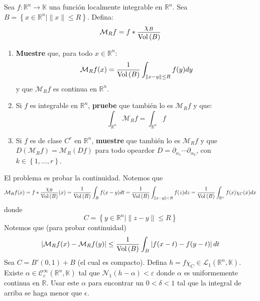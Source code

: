 \documentclass[12pt]{report}
\newcounter{it}
\theoremstyle{largebreak}
\newcommand\abs[1]{\ensuremath{\left|#1\right|}}
\newcommand\cf[3]{\ensuremath{#1:#2\rightarrow#3}}
\newcommand{\Vol}[1]{\ensuremath{\textup{Vol}\left(#1\right)}}
\newcommand{\N}[2]{\ensuremath{\mathcal{N}_{#1}\left(#2\right)}}
\begin{document}
    \begin{excer}
        Sea $\cf{f}{\mathbb{R}^n}{\mathbb{K}}$ una función localmente integrable en $\mathbb{R}^n$. Sea $B=\left\{x\in\mathbb{R}^n\Big|\|x\|\leq R \right\}$. Defina:
        \begin{equation*}
            \mathcal{M}_Rf=f*\frac{\chi_B}{\Vol{B}}
        \end{equation*}
        \begin{enumerate}
            \item \textbf{Muestre} que, para todo $x\in\mathbb{R}^n$:
            \begin{equation*}
                \mathcal{M}_Rf(x)=\frac{1}{\Vol{B}}\int_{\|x-y\|\leq R}f(y)dy
            \end{equation*}
            y que $\mathcal{M}_Rf$ es continua en $\mathbb{R}^n$.
            \item Si $f$ es integrable en $\mathbb{R}^n$, \textbf{pruebe} que también lo es $\mathcal{M}_Rf$ y que:
            \begin{equation*}
                \int_{\mathbb{R}^n}\mathcal{M}_Rf=\int_{\mathbb{R}^n}f
            \end{equation*}
            \item Si $f$ es de clase $C^r$ en $\mathbb{R}^n$, \textbf{muestre} que también lo es $\mathcal{M}_Rf$ y que $D(\mathcal{M}_Rf)=\mathcal{M}_R(Df)$ para todo opeardor $D=\partial_{\alpha_1}\cdots\partial_{\alpha_k}$, con $k\in\left\{1,...,r \right\}$.
        \end{enumerate}
    \end{excer}
    
    \begin{sol}
        El problema es probar la continuidad. Notemos que
        \begin{equation*}
            \mathcal{M}_Rf(x)=f*\frac{\chi_B}{\Vol{B}}(x)=\frac{1}{\Vol{B}}\int_Bf(x-y)dt=\frac{1}{\Vol{B}}\int_{\|x-y\|<R}f(z)dz=\frac{1}{\Vol{B}}\int_{\mathbb{R}^n}f(x)\chi_C(x)dx
        \end{equation*}
        donde
        \begin{equation*}
            C=\left\{y\in\mathbb{R}^n\Big|\|z-y\|\leq R \right\}
        \end{equation*}
        Notemos que (para probar continuidad)
        \begin{equation*}
            \abs{\mathcal{M}_Rf(x)-\mathcal{M}_Rf(y)}\leq\frac{1}{\Vol{B}}\int_B\abs{f(x-t)-f(y-t)}dt
        \end{equation*}
        Sea $C=B'(0,1)+B$ (el cual es compacto). Defina $h=f\chi_C\in\mathcal{L}_1(\mathbb{R}^n,\mathbb{K})$. Existe $\alpha\in\mathcal{C}^\infty_c(\mathbb{R}^n,\mathbb{K})$ tal que $\N{1}{h-\alpha}<\varepsilon$ donde $\alpha$ es uniformemente continua en $\mathbb{R}$. Usar este $\alpha$ para encontrar un $0<\delta<1$ tal que la integral de arriba se haga menor que $\epsilon$.
    \end{sol}
\end{document}
